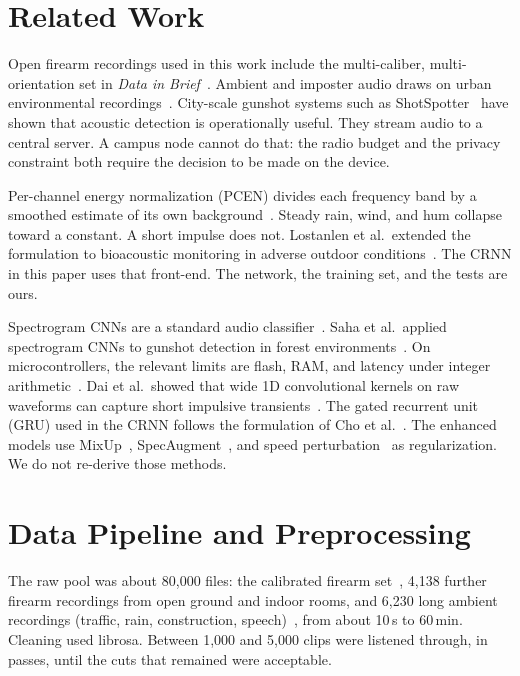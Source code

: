 \documentclass[conference]{IEEEtran}
\begin{document}
\section{Related Work}
\label{sec:related}

Open firearm recordings used in this work include the multi-caliber, multi-orientation set in \emph{Data in Brief}~\cite{dib2023}. Ambient and imposter audio draws on urban environmental recordings~\cite{salamon2014}. City-scale gunshot systems such as ShotSpotter~\cite{magee2019} have shown that acoustic detection is operationally useful. They stream audio to a central server. A campus node cannot do that: the radio budget and the privacy constraint both require the decision to be made on the device.

Per-channel energy normalization (PCEN) divides each frequency band by a smoothed estimate of its own background~\cite{lostanlen2019}. Steady rain, wind, and hum collapse toward a constant. A short impulse does not. Lostanlen et al.\ extended the formulation to bioacoustic monitoring in adverse outdoor conditions~\cite{lostanlen2019taslp}. The CRNN in this paper uses that front-end. The network, the training set, and the tests are ours.

Spectrogram CNNs are a standard audio classifier~\cite{hershey2017}. Saha et al.\ applied spectrogram CNNs to gunshot detection in forest environments~\cite{saha2025}. On microcontrollers, the relevant limits are flash, RAM, and latency under integer arithmetic~\cite{banbury2021}. Dai et al.\ showed that wide 1D convolutional kernels on raw waveforms can capture short impulsive transients~\cite{dai2017}. The gated recurrent unit (GRU) used in the CRNN follows the formulation of Cho et al.~\cite{cho2014}. The enhanced models use MixUp~\cite{zhang2018}, SpecAugment~\cite{park2019}, and speed perturbation~\cite{ko2015} as regularization. We do not re-derive those methods.

\section{Data Pipeline and Preprocessing}
\label{sec:data}

The raw pool was about 80{,}000 files: the calibrated firearm set~\cite{dib2023}, 4{,}138 further firearm recordings from open ground and indoor rooms, and 6{,}230 long ambient recordings (traffic, rain, construction, speech)~\cite{salamon2014}, from about 10\,s to 60\,min. Cleaning used librosa. Between 1{,}000 and 5{,}000 clips were listened through, in passes, until the cuts that remained were acceptable.
\end{document}
